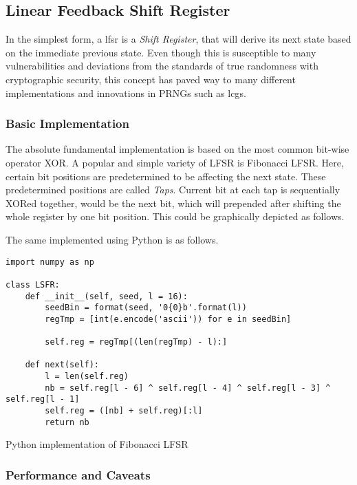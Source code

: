 \subsection{Linear Feedback Shift Register}

In the simplest form, a \acrfull{lfsr} is a \textit{Shift Register}, that will derive its next state based on the immediate previous state. Even though this is susceptible to many vulnerabilities and deviations from the standards of true randomness with cryptographic security, this concept has paved way to many different implementations and innovations in PRNGs such as \acrfull{lcg}s.

\subsubsection{Basic Implementation}

The absolute fundamental implementation is based on the most common bit-wise operator XOR. A popular and simple variety of LFSR is Fibonacci LFSR. Here, certain bit positions are predetermined to be affecting the next state. These predetermined positions are called \textit{Taps}. Current bit at each tap is sequentially XORed together, would be the next bit, which will prepended after shifting the whole register by one bit position. This could be graphically depicted as follows.

The same implemented using Python is as follows.

\begin{code}
\begin{verbatim}
import numpy as np

class LSFR:
	def __init__(self, seed, l = 16):
		seedBin = format(seed, '0{0}b'.format(l))
		regTmp = [int(e.encode('ascii')) for e in seedBin]

		self.reg = regTmp[(len(regTmp) - l):]

	def next(self):
		l = len(self.reg)
		nb = self.reg[l - 6] ^ self.reg[l - 4] ^ self.reg[l - 3] ^ self.reg[l - 1]
		self.reg = ([nb] + self.reg)[:l]
		return nb
\end{verbatim}
\caption{Python implementation of Fibonacci LFSR}
\label{lst:py_class_flfsr}
\end{code}

\subsubsection{Performance and Caveats}

